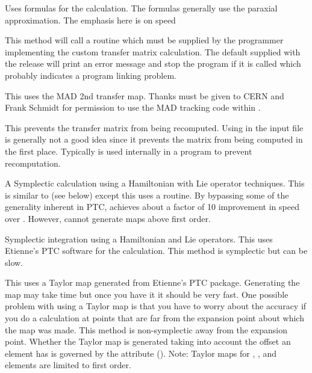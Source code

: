 \begin{description}

\item[\vn{Bmad_Standard}]
Uses formulas for the calculation. The formulas generally use the
paraxial approximation. The emphasis here is on speed

\item[\vn{Custom}]
This method will call a routine  which must be
supplied by the programmer implementing the custom transfer matrix
calculation. The default  supplied with the
\bmad release will print an error message and stop the program if it
is called which probably indicates a program linking problem.

\item[\vn{MAD}]
This uses the MAD 2nd transfer map. Thanks must be given
to CERN and Frank Schmidt for permission to use the MAD tracking code
within \bmad.

\item[\vn{Static}]
This prevents the transfer matrix from being recomputed.
Using  in the input file is generally not a good idea since
it prevents the matrix from being computed in the first place.
Typically  is used internally in a program to prevent recomputation.

\item[\vn{Symp_Lie_Bmad}]
A Symplectic calculation using a Hamiltonian with Lie operator
techniques.  This is similar to  (see below) except
this uses a \bmad routine. By bypassing some of the generality
inherent in PTC,  achieves about a factor
of 10 improvement in speed over . However,
 cannot generate maps above first order.

\item[\vn{Symp_Lie_PTC}]
Symplectic integration using a Hamiltonian and Lie operators.
This uses Etienne's PTC software for the calculation.
This method is symplectic but can be slow.

\item[\vn{Taylor}]
This uses a Taylor map generated from Etienne's PTC
package. Generating the map may take time but once you have it it
should be very fast. One possible problem with using a Taylor map is
that you have to worry about the accuracy if you do a calculation at
points that are far from the expansion point about which the map was
made. This method is non-symplectic away from the expansion
point. Whether the Taylor map is generated taking into account the
offset an element has is governed by the 
attribute ().
Note: Taylor maps for , ,
and  elements are limited to first order.


\end{description}
